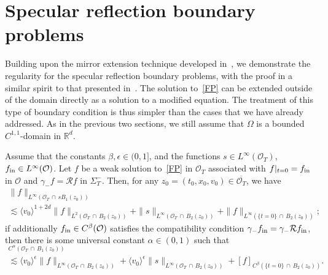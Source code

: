 \documentclass[10pt]{amsart}
\theoremstyle{definition}\newtheorem{defi}[theo]{Definition}\newtheorem{rema}[theo]{Remark}\newtheorem{exam}[theo]{Example}\newtheorem{exem}[theo]{Example}\newtheorem{nota}[theo]{Notation}
\newcommand*\fin {f_{\rm in}}
\newcommand*\R {\mathbb{R}}
\newcommand*\RR {\mathcal{R}}
\newcommand*\OO {\mathcal{O}}
\newcommand{\lvv}{\langle v_0\rangle}
\begin{document}
\section{Specular reflection boundary problems}\label{specular}
Building upon the mirror extension technique developed in~\cite{GHJO,Nier}, we demonstrate the regularity for the specular reflection boundary problems, with the proof in a similar spirit to that presented in~\cite{GHJO}. The solution to~\eqref{FP} can be extended outside of the domain directly as a solution to a modified equation. The treatment of this type of boundary condition is thus simpler than the cases that we have already addressed. As in the previous two sections, we still assume that $\Omega$ is a bounded $C^{1,1}$-domain in $\R^d$.

\begin{prop}\label{locals}
Assume that the constants $\beta,\epsilon\in(0,1]$, and the functions $s\in L^\infty(\OO_T)$, $\fin\in L^\infty(\OO)$. Let $f$ be a weak solution to~\eqref{FP} in $\OO_T$ associated with $f|_{t=0}=\fin$ in $\OO$ and $\gamma_-f=\RR f$ in $\Sigma_T^-$. Then, for any $z_0=(t_0,x_0,v_0)\in\overline{\OO_T}$, we have
\begin{multline*}
\|f\|_{L^\infty\left({\OO_T}\,\cap\,sB_1(z_0)\right)}\\
\lesssim \lvv^{1+2d}\|f\|_{L^2\left({\OO_T}\,\cap \,B_2(z_0)\right)}
+\|s\|_{L^\infty\left({\OO_T}\,\cap\,B_2(z_0)\right)} +\|f\|_{L^\infty\left(\{t=0\}\,\cap \,B_2(z_0)\right)};
\end{multline*}
if additionally $\fin\in C^\beta(\OO)$ satisfies the compatibility condition $\gamma_-\fin=\gamma_-\RR\fin$, then there is some universal constant $\alpha\in(0,1)$ such that
\begin{multline*}
 [f]_{C^\alpha\left({\OO_T}\,\cap\,B_{1}(z_0)\right)}\\
\lesssim \lvv^{\epsilon}\|f\|_{L^\infty\left({\OO_T}\,\cap \,B_{2}(z_0)\right)} 
+\lvv^{\epsilon}\|s\|_{L^\infty\left({\OO_T}\,\cap\,B_{2}(z_0)\right)} + [f]_{C^\beta\left(\{t=0\}\,\cap\,B_{2}(z_0)\right)}.
\end{multline*}
\end{prop}
\end{document}
